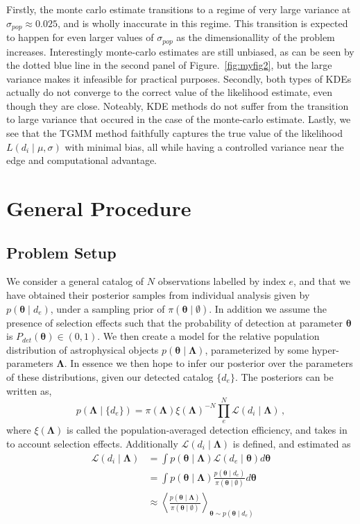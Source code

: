 \documentclass[twocolumn,usenames,dvipsnames,linenumbers]{aastex631}
\newcommand{\btheta}{\boldsymbol{\theta}}
\newcommand{\bLambda}{\boldsymbol{\Lambda}}
\begin{document}
Firstly, the monte carlo estimate transitions to a regime of very large variance at $\sigma_{pop} \approx 0.025$, and is wholly inaccurate in this regime. This transition is expected to happen for even larger values of $\sigma_{pop}$ as the dimensionallity of the problem increases. Interestingly monte-carlo estimates are still unbiased, as can be seen by the dotted blue line in the second panel of Figure.~\ref{fig:myfig2}, but the large variance makes it infeasible for practical purposes. 
Secondly, both types of KDEs actually do not converge to the correct value of the likelihood estimate, even though they are close. Noteably, KDE methods do not suffer from the transition to large variance that occured in the case of the monte-carlo estimate. 
Lastly, we see that the TGMM method faithfully captures the true value of the likelihood $L(d_i \mid \mu, \sigma)$ with minimal bias, all while having a controlled variance near the edge and computational advantage.

\section{General Procedure}
\subsection{Problem Setup}
We consider a general catalog of $N$ observations labelled by index $e$, and that we have obtained their posterior samples from individual analysis given by $p(\btheta \mid d_e)$, under a sampling prior of $\pi(\btheta \mid \emptyset)$.  
In addition we assume the presence of selection effects such that the probability of detection at parameter $\btheta$ is  $P_{det}(\btheta) \in (0,1)$. 
We then create a model for the relative population distribution of astrophysical objects $p(\btheta \mid \bLambda)$, parameterized by some hyper-parameters $\bLambda$. In essence we then hope to infer our posterior over the parameters of these distributions, given our detected catalog $\{d_e\}$. The posteriors can be written as,
\begin{equation}
	p(\bLambda \mid \{d_e\}) = \pi(\bLambda)\xi(\bLambda)^{-N}\prod_{e}^N \mathcal{L}(d_i \mid \bLambda)\,,
	\label{eq:populationposterior}
\end{equation}
where $\xi(\bLambda)$ is called the population-averaged detection efficiency, and takes in to account selection effects. Additionally $ \mathcal{L}(d_i \mid \bLambda)$ is defined, and estimated as
\begin{equation}
\begin{aligned}
		\mathcal{L}(d_i \mid \bLambda) &= \int p(\btheta \mid \bLambda) \mathcal{L}(d_e \mid \btheta) d\btheta \\
	&= \int p(\btheta \mid \bLambda) \frac{p(\btheta\mid d_e)}{\pi(\btheta \mid \emptyset)} d\btheta \\
	&\approx \left\langle \frac{p(\boldsymbol{\theta} \mid \boldsymbol{\Lambda})}{\pi(\boldsymbol{\theta} \mid \emptyset)}  \right\rangle_{\boldsymbol{\theta} \sim p(\btheta \mid d_e)}
 	\label{eq:eventlevelposterior}
\end{aligned}
\end{equation}
\end{document}
